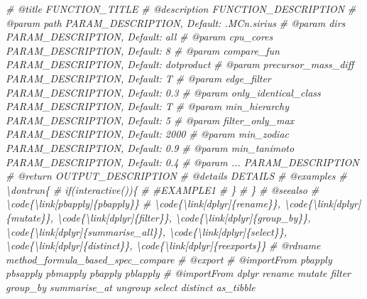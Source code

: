 \documentclass[
]{article}
\newenvironment{Shaded}{\begin{snugshade}}{\end{snugshade}}
\newcommand{\CommentTok}[1]{\textcolor[rgb]{0.56,0.35,0.01}{\textit{#1}}}
\begin{document}
\begin{Shaded}
\begin{Highlighting}[]
\CommentTok{\#\textquotesingle{} @title FUNCTION\_TITLE}
\CommentTok{\#\textquotesingle{} @description FUNCTION\_DESCRIPTION}
\CommentTok{\#\textquotesingle{} @param path PARAM\_DESCRIPTION, Default: .MCn.sirius}
\CommentTok{\#\textquotesingle{} @param dirs PARAM\_DESCRIPTION, Default: \textquotesingle{}all\textquotesingle{}}
\CommentTok{\#\textquotesingle{} @param cpu\_cores PARAM\_DESCRIPTION, Default: 8}
\CommentTok{\#\textquotesingle{} @param compare\_fun PARAM\_DESCRIPTION, Default: \textquotesingle{}dotproduct\textquotesingle{}}
\CommentTok{\#\textquotesingle{} @param precursor\_mass\_diff PARAM\_DESCRIPTION, Default: T}
\CommentTok{\#\textquotesingle{} @param edge\_filter PARAM\_DESCRIPTION, Default: 0.3}
\CommentTok{\#\textquotesingle{} @param only\_identical\_class PARAM\_DESCRIPTION, Default: T}
\CommentTok{\#\textquotesingle{} @param min\_hierarchy PARAM\_DESCRIPTION, Default: 5}
\CommentTok{\#\textquotesingle{} @param filter\_only\_max PARAM\_DESCRIPTION, Default: 2000}
\CommentTok{\#\textquotesingle{} @param min\_zodiac PARAM\_DESCRIPTION, Default: 0.9}
\CommentTok{\#\textquotesingle{} @param min\_tanimoto PARAM\_DESCRIPTION, Default: 0.4}
\CommentTok{\#\textquotesingle{} @param ... PARAM\_DESCRIPTION}
\CommentTok{\#\textquotesingle{} @return OUTPUT\_DESCRIPTION}
\CommentTok{\#\textquotesingle{} @details DETAILS}
\CommentTok{\#\textquotesingle{} @examples }
\CommentTok{\#\textquotesingle{} \textbackslash{}dontrun\{}
\CommentTok{\#\textquotesingle{} if(interactive())\{}
\CommentTok{\#\textquotesingle{}  \#EXAMPLE1}
\CommentTok{\#\textquotesingle{}  \}}
\CommentTok{\#\textquotesingle{} \}}
\CommentTok{\#\textquotesingle{} @seealso }
\CommentTok{\#\textquotesingle{}  \textbackslash{}code\{\textbackslash{}link[pbapply]\{pbapply\}\}}
\CommentTok{\#\textquotesingle{}  \textbackslash{}code\{\textbackslash{}link[dplyr]\{rename\}\}, \textbackslash{}code\{\textbackslash{}link[dplyr]\{mutate\}\}, \textbackslash{}code\{\textbackslash{}link[dplyr]\{filter\}\}, \textbackslash{}code\{\textbackslash{}link[dplyr]\{group\_by\}\}, \textbackslash{}code\{\textbackslash{}link[dplyr]\{summarise\_all\}\}, \textbackslash{}code\{\textbackslash{}link[dplyr]\{select\}\}, \textbackslash{}code\{\textbackslash{}link[dplyr]\{distinct\}\}, \textbackslash{}code\{\textbackslash{}link[dplyr]\{reexports\}\}}
\CommentTok{\#\textquotesingle{} @rdname method\_formula\_based\_spec\_compare}
\CommentTok{\#\textquotesingle{} @export }
\CommentTok{\#\textquotesingle{} @importFrom pbapply pbsapply pbmapply pbapply pblapply}
\CommentTok{\#\textquotesingle{} @importFrom dplyr rename mutate filter group\_by summarise\_at ungroup select distinct as\_tibble}


\end{Highlighting}
\end{Shaded}
\end{document}
